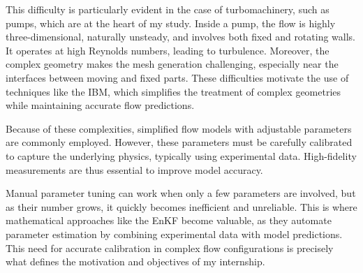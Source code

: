 This difficulty is particularly evident in the case of turbomachinery, such as pumps, which are at the heart of my study. Inside a pump, the flow is highly three-dimensional, naturally unsteady, and involves both fixed and rotating walls. It operates at high Reynolds numbers, leading to turbulence. Moreover, the complex geometry makes the mesh generation challenging, especially near the interfaces between moving and fixed parts. These difficulties motivate the use of techniques like the \ac{IBM}, which simplifies the treatment of complex geometries while maintaining accurate flow predictions.

Because of these complexities, simplified flow models with adjustable parameters are commonly employed. However, these parameters must be carefully calibrated to capture the underlying physics, typically using experimental data. High-fidelity measurements are thus essential to improve model accuracy.

Manual parameter tuning can work when only a few parameters are involved, but as their number grows, it quickly becomes inefficient and unreliable. This is where mathematical approaches like the \ac{EnKF} become valuable, as they automate parameter estimation by combining experimental data with model predictions. This need for accurate calibration in complex flow configurations is precisely what defines the motivation and objectives of my internship.




